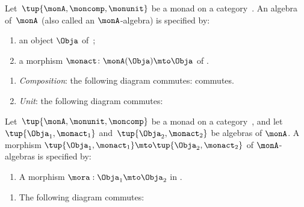 \begin{ctdefinition}
    \label{def:monad-algebra}
    Let~$\tup{\monA, \moncomp, \monunit}$ be a monad on a category~\CatC.
    An algebra of~$\monA$ (also called an $\monA$-algebra) is specified by: \

    \constit
    \begin{enumerate}
        \item an object $\Obja$ of~\CatC;
        \item a morphism $\monact\colon \monA(\Obja) \mto \Obja$ of \CatC.
    \end{enumerate}
    \condit
    \begin{enumerate}
        \item \emph{Composition}: the following diagram commutes:
              commutes.
        \item \emph{Unit}: the following diagram commutes:

    \end{enumerate}
\end{ctdefinition}



\begin{ctdefinition}
    \label{def:algebramorphism}
    Let~$\tup{\monA, \monunit, \moncomp}$ be a monad on a category~\CatC, and let~$\tup{\Obja_1, \monact_1}$ and~$\tup{\Obja_2, \monact_2}$ be algebras of $\monA$.
    A morphism $\tup{\Obja_1, \monact_1} \mto \tup{\Obja_2, \monact_2}$ of $\monA$-algebras is specified by: \

    \constit
    \begin{enumerate}
        \item A morphism $\mora : \Obja_1 \mto \Obja_2$ in \CatC.
    \end{enumerate}
    \condit
    \begin{enumerate}
        \item The following diagram commutes:

    \end{enumerate}
\end{ctdefinition}


